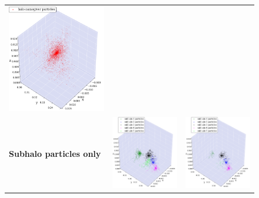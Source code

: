 \begin{subfigures}
\begin{figure}[!htbp]
{\begin{tabular}{|p{.5cm} c c|}
				{\includegraphics[width = .42\textwidth]{images/cosmo/cos-halo-66858-halo-only-nosaddle.png}} \hspace*{-1em}		\\
				\begin{sideways}{ \hspace{2cm}\textbf{Subhalo particles only} }\end{sideways}	 \hspace*{-1em}			 &
				{\includegraphics[width = .42\textwidth]{images/cosmo/cos-halo-66858-subhalo-only-phew.png}} &
				{\includegraphics[width = .42\textwidth]{images/cosmo/cos-halo-66858-subhalo-only-nosaddle.png}} \\
				\hline
			\end{tabular}
}
\end{figure}
\end{subfigures}
